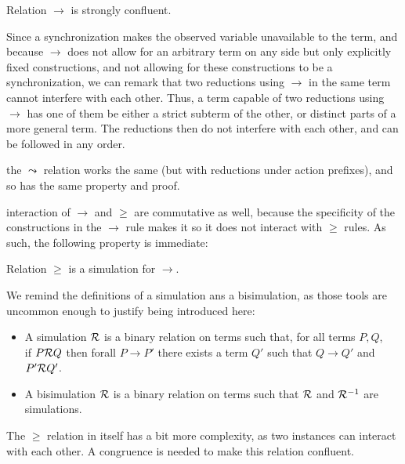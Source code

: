\begin{proposition}
Relation $\to$ is strongly confluent.
\end{proposition}

\begin{myproof}
Since a synchronization makes the observed variable unavailable to the term, and because $\to$ does not allow for an arbitrary term on any side but only explicitly fixed constructions, and not allowing for these constructions to be a synchronization, we can remark that two reductions using $\to$ in the same term cannot interfere with each other. Thus, a term capable of two reductions using $\to$ has one of them be either a strict subterm of the other, or distinct parts of a more general term. The reductions then do not interfere with each other, and can be followed in any order.
\end{myproof}

\remark the $\leadsto$ relation works the same (but with reductions under action prefixes), and so has the same property and proof.

\remark interaction of $\to$ and $\geq$ are commutative as well, because the specificity of the constructions in the $\to$ rule makes it so it does not interact with $\geq$ rules. As such, the following property is immediate:\\

\begin{proposition}
Relation $\geq$ is a simulation for $\to$.
\end{proposition}

We remind the definitions of a simulation ans a bisimulation, as those tools are uncommon enough to justify being introduced here:

\begin{definition}
\begin{itemize}
	\item A simulation $\mathcal{R}$ is a binary relation on terms such that, for all terms $P,Q$,\\
		if $P \mathcal{R} Q$ then forall $P \to P'$ there exists a term $Q'$ such that $Q \to Q'$ and $P' \mathcal{R} Q'$.
	\item A bisimulation $\mathcal{R}$ is a binary relation on terms such that $\mathcal{R}$ and $\mathcal{R}^{-1}$ are simulations.
\end{itemize}
\end{definition}

The $\geq$ relation in itself has a bit more complexity, as two instances can interact with each other. A congruence is needed to make this relation confluent.

